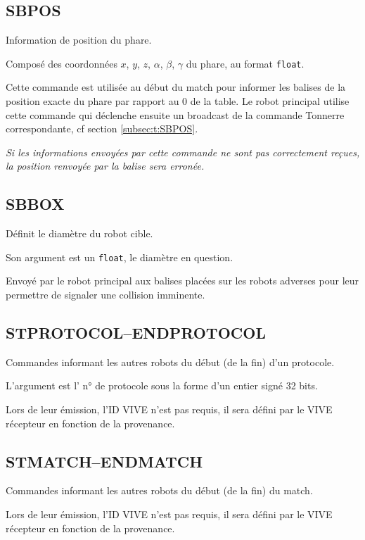 \subsection{SBPOS}
	\label{subsec:a:SBPOS}

	Information de position du phare.

	Composé des coordonnées $x$, $y$, $z$, $\alpha$, $\beta$, $\gamma$ du phare, au format \verb|float|.

	Cette commande est utilisée au début du match pour informer les balises de la position exacte du phare par rapport au $0$ de la table. Le robot principal utilise cette commande qui déclenche ensuite un broadcast de la commande Tonnerre correspondante, cf section \ref{subsec:t:SBPOS}.

	\emph{Si les informations envoyées par cette commande ne sont pas correctement reçues, la position renvoyée par la balise sera erronée.}

\subsection{SBBOX}
	\label{subsec:a:SBBOX}

	Définit le diamètre du robot cible.

	Son argument est un \verb|float|, le diamètre en question.

	Envoyé par le robot principal aux balises placées sur les robots adverses pour leur permettre de signaler une collision imminente.

\subsection{STPROTOCOL--ENDPROTOCOL}
	\label{subsec:a:SP-EP}

	Commandes informant les autres robots du début (de la fin) d'un protocole.

	L'argument est l' n° de protocole sous la forme d'un entier signé 32 bits.

	Lors de leur émission, l'ID VIVE n'est pas requis, il sera défini par le VIVE récepteur en fonction de la provenance.

\subsection{STMATCH--ENDMATCH}
	\label{subsec:a:SM-EM}

	Commandes informant les autres robots du début (de la fin) du match.

	Lors de leur émission, l'ID VIVE n'est pas requis, il sera défini par le VIVE récepteur en fonction de la provenance.

